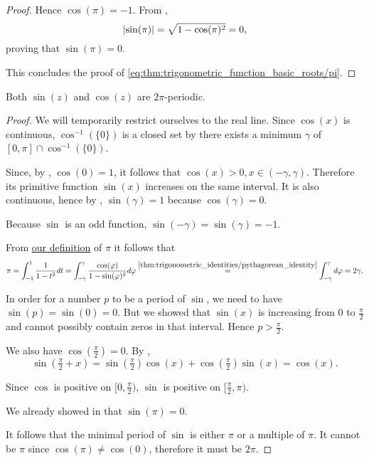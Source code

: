 \begin{proof}
  Hence \( \cos(\pi) = -1 \). From ,
  \begin{equation*}
    \left\vert \sin(\pi) \right\vert = \sqrt{1 - \cos(\pi)^2} = 0,
  \end{equation*}
  proving that \( \sin(\pi) = 0 \).

  This concludes the proof of \eqref{eq:thm:trigonometric_function_basic_roots/pi}.
\end{proof}

\begin{theorem}\label{thm:trigonometric_function_period}
  Both \( \sin(z) \) and \( \cos(z) \) are \( 2\pi \)-periodic.
\end{theorem}
\begin{proof}
  We will temporarily restrict ourselves to the real line. Since \( \cos(x) \) is continuous, \( \cos^{-1}(\{ 0 \}) \) is a closed set by  there exists a minimum \( \gamma \) of \( [0, \pi] \cap \cos^{-1}(\{ 0 \}) \).

  Since, by , \( \cos(0) = 1 \), it follows that \( \cos(x) > 0, x \in (-\gamma, \gamma) \). Therefore its primitive function \( \sin(x) \) increases on the same interval. It is also continuous, hence by , \( \sin(\gamma) = 1 \) because \( \cos(\gamma) = 0 \).

  Because \( \sin \) is an odd function, \( \sin(-\gamma) = \sin(\gamma) = -1 \).

  From \hyperref[def:pi]{our definition} of \( \pi \) it follows that
  \begin{equation*}
    \pi
    =
    \int_{-1}^1 \frac 1 {1 - t^2} dt
    =
    \int_{-\gamma}^\gamma \frac {\cos(\varphi)} {1 - \sin(\varphi)^2} d\varphi
    \overset {\ref{thm:trigonometric_identities/pythagorean_identity}} =
    \int_{-\gamma}^\gamma d\varphi
    =
    2\gamma.
  \end{equation*}

  In order for a number \( p \) to be a period of \( \sin \), we need to have \( \sin(p) = \sin(0) = 0 \). But we showed that \( \sin(x) \) is increasing from \( 0 \) to \( \tfrac \pi 2 \) and cannot possibly contain zeros in that interval. Hence \( p > \tfrac \pi 2 \).

  We also have \( \cos(\tfrac \pi 2) = 0 \). By ,
  \begin{equation*}
    \sin(\tfrac \pi 2 + x)
    =
    \sin(\tfrac \pi 2) \cos(x) + \cos(\tfrac \pi 2) \sin(x)
    =
    \cos(x).
  \end{equation*}

  Since \( \cos \) is positive on \( [0, \tfrac \pi 2) \), \( \sin \) is positive on \( [\tfrac \pi 2, \pi) \).

  We already showed in  that \( \sin(\pi) = 0 \).

  It follows that the minimal period of \( \sin \) is either \( \pi \) or a multiple of \( \pi \). It cannot be \( \pi \) since \( \cos(\pi) \neq \cos(0) \), therefore it must be \( 2\pi \).
\end{proof}

